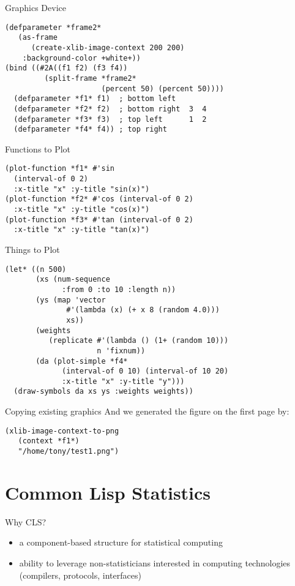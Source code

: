 \documentclass{beamer}
\begin{document}
\begin{frame}[fragile]{Graphics Device}
\begin{verbatim}
(defparameter *frame2*
   (as-frame
      (create-xlib-image-context 200 200)
 	:background-color +white+))
(bind ((#2A((f1 f2) (f3 f4))
         (split-frame *frame2*
                      (percent 50) (percent 50))))
  (defparameter *f1* f1)  ; bottom left   
  (defparameter *f2* f2)  ; bottom right  3  4
  (defparameter *f3* f3)  ; top left      1  2
  (defparameter *f4* f4)) ; top right
\end{verbatim}
\end{frame}

\begin{frame}[fragile]{Functions to Plot}
\begin{verbatim}
(plot-function *f1* #'sin
  (interval-of 0 2)
  :x-title "x" :y-title "sin(x)")
(plot-function *f2* #'cos (interval-of 0 2)
  :x-title "x" :y-title "cos(x)")
(plot-function *f3* #'tan (interval-of 0 2)
  :x-title "x" :y-title "tan(x)")
\end{verbatim}
\end{frame}

\begin{frame}[fragile]{Things to Plot}
\begin{verbatim}
(let* ((n 500)
       (xs (num-sequence
             :from 0 :to 10 :length n))
       (ys (map 'vector
              #'(lambda (x) (+ x 8 (random 4.0)))
              xs))
       (weights
          (replicate #'(lambda () (1+ (random 10)))
                     n 'fixnum))
       (da (plot-simple *f4*
             (interval-of 0 10) (interval-of 10 20)
             :x-title "x" :y-title "y")))
  (draw-symbols da xs ys :weights weights))
\end{verbatim}
\end{frame}

\begin{frame}[fragile]{Copying existing graphics}
  And we generated the figure on the first page by:
\begin{verbatim}
(xlib-image-context-to-png
   (context *f1*)
   "/home/tony/test1.png")
\end{verbatim}
\end{frame}


\section{Common Lisp Statistics}

\begin{frame}{Why CLS?}
  \begin{itemize}
  \item a component-based structure for statistical computing
  \item ability to leverage non-statisticians interested in computing
    technologies (compilers, protocols, interfaces)
  \end{itemize}
\end{frame}
\end{document}
